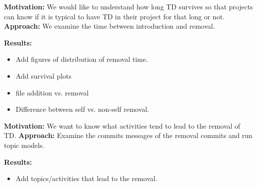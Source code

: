 \noindent \textbf{Motivation:} 
We would like to understand how long TD survives so that projects can know if it is typical to have TD in their project for that long or not.
\vspace{1mm}
\noindent \textbf{Approach:} 
We examine the time between introduction and removal.

\vspace{1mm}
\noindent \textbf{Results:} 
\begin{itemize}
\item Add figures of distribution of removal time.
\item Add survival plots
\item file addition vs. removal
\item Difference between self vs. non-self removal.
\end{itemize}


 \vspace{3mm}
 \noindent\rqiv
 \vspace{3mm}

 \noindent \textbf{Motivation:} 
We want to know what activities tend to lead to the removal of TD.
 \vspace{1mm}
 \noindent \textbf{Approach:} 
Examine the commits messages of the removal commits and run topic models.
 \vspace{1mm}
 
 \noindent \textbf{Results:} 
\begin{itemize}
\item Add topics/activities that lead to the removal.
\end{itemize}
 \conclusionbox{}